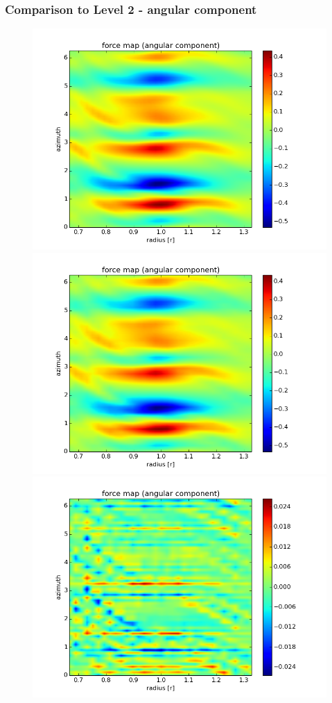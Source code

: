 \documentclass{beamer}
\begin{document}
\begin{frame}
 \frametitle{Comparison to Level 2 - angular component}
 \begin{figure}[H]
  \centering
  \includegraphics[width=.4\textwidth]{angular_pure_lvl2.png} \includegraphics[width=.4\textwidth]{angular_refined_lvl3.png} \\
  \includegraphics[width=.4\textwidth]{angular_puretorefined_diff2to3.png}
\end{figure}
\end{frame}
\end{document}

